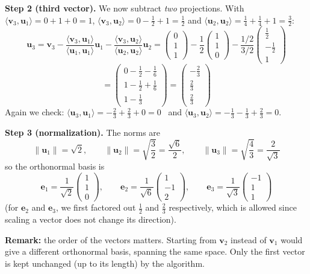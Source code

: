 \documentclass[]{article}
\begin{document}
	\noindent \textbf{Step 2 (third vector).} We now subtract \textit{two} projections.
	With $\langle \mathbf{v}_3, \mathbf{u}_1 \rangle = 0 + 1 + 0 = 1$, $\langle \mathbf{v}_3, \mathbf{u}_2 \rangle = 0 - \frac{1}{2} + 1 = \frac{1}{2}$ and $\langle \mathbf{u}_2, \mathbf{u}_2 \rangle = \frac{1}{4} + \frac{1}{4} + 1 = \frac{3}{2}$:
	$$
	\mathbf{u}_3 = \mathbf{v}_3
	- \frac{\langle \mathbf{v}_3, \mathbf{u}_1 \rangle}{\langle \mathbf{u}_1, \mathbf{u}_1 \rangle} \mathbf{u}_1
	- \frac{\langle \mathbf{v}_3, \mathbf{u}_2 \rangle}{\langle \mathbf{u}_2, \mathbf{u}_2 \rangle} \mathbf{u}_2
	= \begin{pmatrix} 0 \\ 1 \\ 1 \end{pmatrix}
	- \frac{1}{2}\begin{pmatrix} 1 \\ 1 \\ 0 \end{pmatrix}
	- \frac{1/2}{3/2}\begin{pmatrix} \frac{1}{2} \\ -\frac{1}{2} \\ 1 \end{pmatrix}
	$$
	$$
	= \begin{pmatrix} 0 - \frac{1}{2} - \frac{1}{6} \\ 1 - \frac{1}{2} + \frac{1}{6} \\ 1 - \frac{1}{3} \end{pmatrix}
	= \begin{pmatrix} -\frac{2}{3} \\ \frac{2}{3} \\ \frac{2}{3} \end{pmatrix}
	$$
	Again we check: $\langle \mathbf{u}_3, \mathbf{u}_1 \rangle = -\frac{2}{3} + \frac{2}{3} + 0 = 0$ \checkmark \ and $\langle \mathbf{u}_3, \mathbf{u}_2 \rangle = -\frac{1}{3} - \frac{1}{3} + \frac{2}{3} = 0$. \checkmark

	\noindent \textbf{Step 3 (normalization).} The norms are
	$$
	\|\mathbf{u}_1\| = \sqrt{2}, \qquad
	\|\mathbf{u}_2\| = \sqrt{\frac{3}{2}} = \frac{\sqrt{6}}{2}, \qquad
	\|\mathbf{u}_3\| = \sqrt{\frac{4}{3}} = \frac{2}{\sqrt{3}}
	$$
	so the orthonormal basis is
	$$
	\mathbf{e}_1 = \frac{1}{\sqrt{2}}\begin{pmatrix} 1 \\ 1 \\ 0 \end{pmatrix}, \qquad
	\mathbf{e}_2 = \frac{1}{\sqrt{6}}\begin{pmatrix} 1 \\ -1 \\ 2 \end{pmatrix}, \qquad
	\mathbf{e}_3 = \frac{1}{\sqrt{3}}\begin{pmatrix} -1 \\ 1 \\ 1 \end{pmatrix}
	$$
	(for $\mathbf{e}_2$ and $\mathbf{e}_3$, we first factored out $\frac{1}{2}$ and $\frac{2}{3}$ respectively, which is allowed since scaling a vector does not change its direction).

	\noindent \textbf{Remark:} the order of the vectors matters.
	Starting from $\mathbf{v}_2$ instead of $\mathbf{v}_1$ would give a different orthonormal basis, spanning the same space.
	Only the first vector is kept unchanged (up to its length) by the algorithm.
	
	
	
\end{document}
